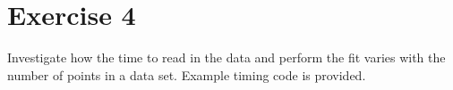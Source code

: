 \chapter{Exercise 4}

Investigate how the time to read in the data and perform the fit varies with
the number of points in a data set. Example timing code is provided.